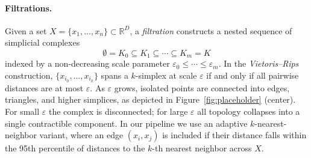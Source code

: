 \begin{figure}[htbp]
\centering
\begin{minipage}{.48\textwidth}
  \centering
  
  \label{fig:test1}
\end{minipage}\hfill
\begin{minipage}{.48\textwidth}
  \centering

  \label{fig:test2}
\end{minipage}
\end{figure}

\paragraph{Filtrations.}
Given a set $X = \{x_1, \ldots, x_n\} \subset \mathbb{R}^D$,
a \emph{filtration} constructs a nested sequence of simplicial complexes
\begin{equation}
    \emptyset = K_0 \subseteq K_1 \subseteq \cdots \subseteq K_m = K
    \label{eq:filtration}
\end{equation}
indexed by a non-decreasing scale parameter $\varepsilon_0 \leq \cdots
\leq \varepsilon_m$. In the \emph{Vietoris--Rips} construction,
$\{x_{i_0}, \ldots, x_{i_k}\}$ spans a $k$-simplex at scale $\varepsilon$
if and only if all pairwise distances are at most $\varepsilon$. As
$\varepsilon$ grows, isolated points are connected into edges, triangles,
and higher simplices, as depicted in Figure~\ref{fig:placeholder}
(center). For small $\varepsilon$ the complex is disconnected; for large
$\varepsilon$ all topology collapses into a single contractible component.
In our pipeline we use an adaptive $k$-nearest-neighbor variant, where
an edge $(x_i, x_j)$ is included if their distance falls within the
95th percentile of distances to the $k$-th nearest neighbor across $X$.

